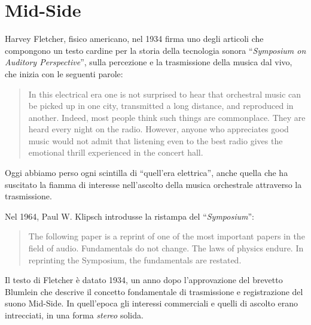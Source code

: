 \section{Mid-Side}
Harvey Fletcher, fisico americano, nel 1934 firma uno degli articoli che
compongono un testo cardine per la storia della tecnologia sonora
“\emph{Symposium on Auditory Perspective}”, sulla percezione e la trasmissione
della musica dal vivo, che inizia con le seguenti parole:

\begin{quote}
In this electrical era one is not surprised to hear that orchestral music can be
picked up in one city, transmitted a long distance, and reproduced in another.
Indeed, most people think such things are commonplace. They are heard every
night on the radio. However, anyone who appreciates good music would not admit
that listening even to the best radio gives the emotional thrill experienced in
the concert hall. \cite{hf34}
\end{quote}

Oggi abbiamo perso ogni scintilla di “quell'era elettrica”, anche quella che ha
suscitato la fiamma di interesse nell'ascolto della musica orchestrale
attraverso la trasmissione.


Nel 1964, Paul W. Klipsch introdusse la ristampa del “\emph{Symposium}”:

\begin{quote}
The following paper is a reprint of one of the most important papers in the
field of audio. Fundamentals do not change. The laws of physics endure. In
reprinting the Symposium, the fundamentals are restated. \cite{sap1964}
\end{quote}

Il testo di Fletcher \cite{hf34} è datato 1934, un anno dopo l'approvazione
del brevetto Blumlein che descrive il concetto fondamentale di trasmissione e
registrazione del suono Mid-Side. In quell'epoca gli interessi commerciali e
quelli di ascolto erano intrecciati, in una forma \emph{stereo} solida.

